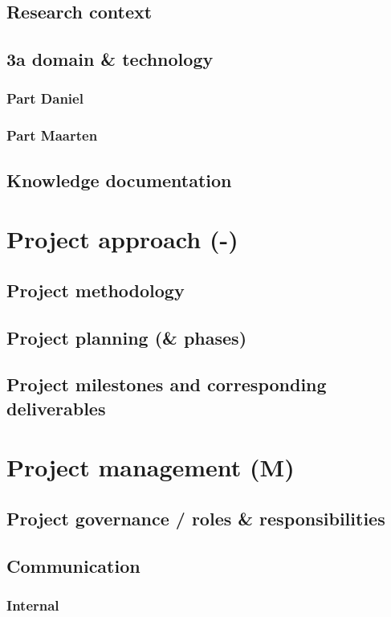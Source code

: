\documentclass[a4paper,12pt,abstracton,titlepage]{scrartcl}
\begin{document}
\subsection{Research context}
\subsection{3a domain \& technology}
\subsubsection{Part Daniel}
\subsubsection{Part Maarten}
\subsection{Knowledge documentation}

\section{Project approach (-)}
\label{sec:project-approach}
\subsection{Project methodology}
\subsection{Project planning (\& phases)}
\subsection{Project milestones and corresponding deliverables }

\section{Project management (M)}
\label{sec:project-management}
\subsection{Project governance / roles \& responsibilities}
\subsection{Communication}
\subsubsection{Internal}
\end{document}
